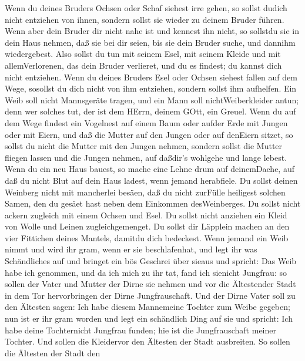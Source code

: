  Wenn du deines Bruders Ochsen oder Schaf siehest irre
gehen, so sollst dudich nicht entziehen von ihnen, sondern sollst sie
wieder zu deinem Bruder führen.  Wenn aber dein Bruder dir
nicht nahe ist und kennest ihn nicht, so sollstdu sie in dein Haus
nehmen, daß sie bei dir seien, bis sie dein Bruder suche, und dannihm
wiedergebest.  Also sollst du tun mit seinem Esel, mit
seinem Kleide und mit allemVerlorenen, das dein Bruder verlieret, und du
es findest; du kannst dich nicht entziehen.  Wenn du deines
Bruders Esel oder Ochsen siehest fallen auf dem Wege, sosollst du dich
nicht von ihm entziehen, sondern sollst ihm aufhelfen.  Ein
Weib soll nicht Mannsgeräte tragen, und ein Mann soll nichtWeiberkleider
antun; denn wer solches tut, der ist dem HErrn, deinem GOtt, ein Greuel.
 Wenn du auf dem Wege findest ein Vogelnest auf einem Baum
oder aufder Erde mit Jungen oder mit Eiern, und daß die Mutter auf den
Jungen oder auf denEiern sitzet, so sollst du nicht die Mutter mit den
Jungen nehmen,  sondern sollst die Mutter fliegen lassen und
die Jungen nehmen, auf daßdir's wohlgehe und lange lebest. 
Wenn du ein neu Haus bauest, so mache eine Lehne drum auf deinemDache,
auf daß du nicht Blut auf dein Haus ladest, wenn jemand herabfiele.
 Du sollst deinen Weinberg nicht mit mancherlei besäen, daß
du nicht zurFülle heiligest solchen Samen, den du gesäet hast neben dem
Einkommen desWeinberges.  Du sollst nicht ackern zugleich
mit einem Ochsen und Esel.  Du sollst nicht anziehen ein
Kleid von Wolle und Leinen zugleichgemenget.  Du sollst dir
Läpplein machen an den vier Fittichen deines Mantels, damitdu dich
bedeckest.  Wenn jemand ein Weib nimmt und wird ihr gram,
wenn er sie beschlafenhat,  und legt ihr was Schändliches
auf und bringet ein bös Geschrei über sieaus und spricht: Das Weib habe
ich genommen, und da ich mich zu ihr tat, fand ich sienicht Jungfrau:
 so sollen der Vater und Mutter der Dirne sie nehmen und
vor die Ältestender Stadt in dem Tor hervorbringen der Dirne
Jungfrauschaft.  Und der Dirne Vater soll zu den Ältesten
sagen: Ich habe diesem Mannemeine Tochter zum Weibe gegeben; nun ist er
ihr gram worden  und legt ein schändlich Ding auf sie und
spricht: Ich habe deine Tochternicht Jungfrau funden; hie ist die
Jungfrauschaft meiner Tochter. Und sollen die Kleidervor den Ältesten
der Stadt ausbreiten.  So sollen die Ältesten der Stadt den
